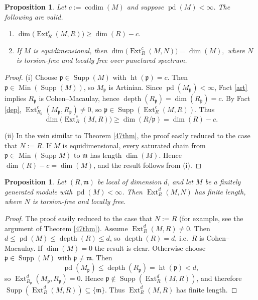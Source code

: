 \documentclass[11.05pt,a4paper]{amsart}
\newtheorem{proposition}[theorem]{Proposition}
\theoremstyle{definition}
\theoremstyle{remark}
\newcommand{\Min}{\operatorname{Min}}
\newcommand{\pd}{\operatorname{pd}}
\newcommand{\Ext}{\operatorname{Ext}}
\newcommand{\Supp}{\operatorname{Supp}}
\newcommand{\depth}{\operatorname{depth}}
\begin{document}
\begin{proposition}
	Let $c := \operatorname{codim}(M)$ and suppose $\pd(M) < \infty$. The following  are valid.
	
	\begin{enumerate}
		\item[(i)] \(\dim\!\big(\Ext^{c}_R(M,R)\big) \ge \dim(R) - c.\)
		
		\item[(ii)] If $M$ is equidimensional, then
		\(\dim\!\big(\Ext^{c}_R(M,N)\big) = \dim(M),\) where  $N$  is torsion-free and locally free over punctured spectrum. 
	\end{enumerate}
\end{proposition}

\begin{proof}
	(i) Choose $\mathfrak p \in \Supp(M)$ with $\operatorname{ht}(\mathfrak p)=c$. Then $\mathfrak p \in \Min(\Supp(M))$, so $M_{\mathfrak p}$ is Artinian. Since $\pd(M_{\mathfrak p}) < \infty$, Fact \ref{art} implies $R_{\mathfrak p}$ is Cohen–Macaulay, hence
	\(
	\depth(R_{\mathfrak p}) = \dim(R_{\mathfrak p}) = c.
	\)
	By Fact \ref{dep}, $\Ext^c_{R_{\mathfrak p}}(M_{\mathfrak p}, R_{\mathfrak p}) \neq 0$, so
	$\mathfrak p \in \Supp(\Ext^c_R(M,R))$. Thus
	\[
	\dim\!\big(\Ext^c_R(M,R)\big) \ge \dim(R/\mathfrak p) = \dim(R) - c.
	\]
	
	(ii) In the vein similar to  {Theorem} \ref{47thm}, the proof easily reduced to the case that $N:=R$. If $M$ is equidimensional, every saturated chain from $\mathfrak p \in \Min(\Supp M)$ to $\mathfrak m$ has length $\dim(M)$. Hence $\dim(R) - c = \dim(M)$, and the result follows from (i).
\end{proof}

\begin{proposition}
	Let $(R,\mathfrak m)$ be local of dimension $d$, and let $M$ be a finitely generated module with $\pd(M) < \infty$. Then $\Ext^{d}_R(M,N)$ has finite length, where  $N$  is torsion-free and locally free. 
\end{proposition}

\begin{proof}The proof easily reduced to the case that $N:=R$ (for example, see the argument of {Theorem} \ref{47thm}).
	Assume $\Ext^{d}_R(M,R) \neq 0$. Then $d \le \pd(M) \le \depth(R) \le d$, so $\depth(R)=d$, i.e.\ $R$ is Cohen–Macaulay.
If $\dim(M)=0$ the result is clear. Otherwise choose $\mathfrak p \in \Supp(M)$ with $\mathfrak p \ne \mathfrak m$. Then
	\[
	\pd(M_{\mathfrak p}) \le \depth(R_{\mathfrak p}) = \operatorname{ht}(\mathfrak p) < d,
	\]
	so $\Ext^{d}_{R_{\mathfrak p}}(M_{\mathfrak p}, R_{\mathfrak p}) = 0$. Hence $\mathfrak p \notin \Supp(\Ext^d_R(M,R))$, and therefore
	\(
	\Supp(\Ext^d_R(M,R)) \subseteq \{\mathfrak m\}.
	\)
	Thus $\Ext^d_R(M,R)$ has finite length.
\end{proof}
\end{document}
